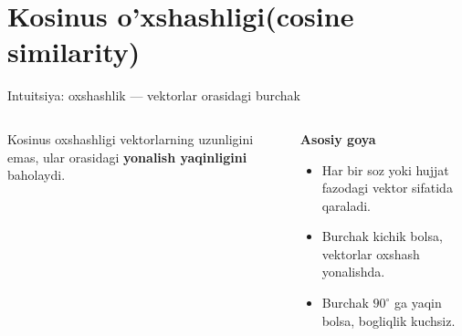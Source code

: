 \documentclass[aspectratio=169,11pt]{beamer}
\begin{document}
\section[Kosinus]{Kosinus o'xshashligi(cosine similarity)}

\begin{frame}{Intuitsiya: o\textquotesingle{}xshashlik — vektorlar orasidagi burchak}
\small

\begin{columns}[T,totalwidth=\textwidth]
\begin{column}{0.46\textwidth}
\centering
{}

\vspace{6pt}

\begin{tcolorbox}[defbox,width=0.95\linewidth]
\footnotesize
Kosinus o\textquotesingle{}xshashligi vektorlarning uzunligini emas,
ular orasidagi \textbf{yo\textquotesingle{}nalish yaqinligini} baholaydi.
\end{tcolorbox}
\end{column}

\begin{column}{0.50\textwidth}
\textbf{Asosiy g\textquotesingle{}oya}

\vspace{4pt}
\begin{itemize}\setlength\itemsep{5pt}
  \item Har bir so\textquotesingle{}z yoki hujjat fazodagi vektor sifatida qaraladi.
  \item Burchak kichik bo\textquotesingle{}lsa, vektorlar o\textquotesingle{}xshash yo\textquotesingle{}nalishda.
  \item Burchak $90^\circ$ ga yaqin bo\textquotesingle{}lsa, bog\textquotesingle{}liqlik kuchsiz.
\end{itemize}


\end{column}
\end{columns}
\end{frame}
\end{document}

